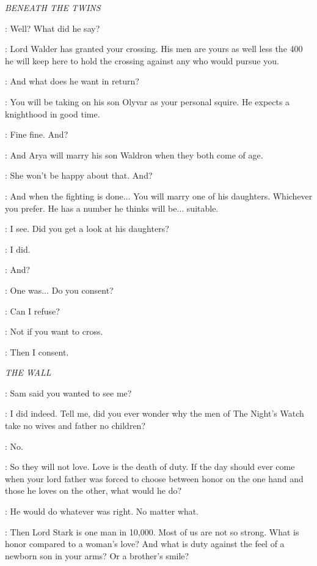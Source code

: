 \scene

\textit{BENEATH THE TWINS} 


\ROBB: Well? What did he say? 

\CATELYN: Lord Walder has granted your crossing. His men are yours as well less the 400 he will keep here to hold the crossing against any who would pursue you. 

\ROBB: And what does he want in return? 

\CATELYN: You will be taking on his son Olyvar as your personal squire. He expects a knighthood in good time. 

\ROBB: Fine fine. And? 

\CATELYN: And Arya will marry his son Waldron when they both come of age. 

\ROBB: She won't be happy about that. And? 

\CATELYN: And when the fighting is done$\ldots$ You will marry one of his daughters. Whichever you prefer. He has a number he thinks will be$\ldots$ suitable. 

\ROBB: I see. Did you get a look at his daughters? 

\CATELYN: I did. 

\ROBB: And? 

\CATELYN: One was$\ldots$ Do you consent? 

\ROBB: Can I refuse? 

\CATELYN: Not if you want to cross. 

\ROBB: Then I consent. 


\scene

\textit{THE WALL} 

\JON: Sam said you wanted to see me? 

\AEMON: I did indeed.  Tell me, did you ever wonder why the men of The Night's Watch take no wives and father no children? 

\JON: No. 

\AEMON: So they will not love. Love is the death of duty. If the day should ever come when your lord father was forced to choose between honor on the one hand and those he loves on the other, what would he do? 

\JON: He would do whatever was right. No matter what. 

\AEMON: Then Lord Stark is one man in 10,000. Most of us are not so strong. What is honor compared to a woman's love? And what is duty against the feel of a newborn son in your arms? Or a brother's smile? 

